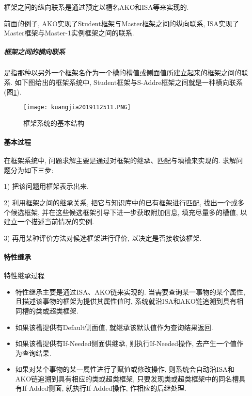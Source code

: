 框架之间的纵向联系是通过预定以槽名AKO和ISA等来实现的.
\begin{example}
  前面的例子, AKO实现了Student框架与Master框架之间的纵向联系, ISA实现了Master框架与Master-1实例框架之间的联系.
\end{example}
\subparagraph{框架之间的横向联系}
是指那种以另外一个框架名作为一个槽的槽值或侧面值所建立起来的框架之间的联系. 如下图给出的框架系统中, Student框架与S-Addre框架之间就是一种横向联系(图\ref{AI32fig11}).
\begin{figure}[H]
\centering
\texttt{[image: kuangjia2019112511.PNG]}
\caption{框架系统的基本结构}
\label{AI32fig11}
\end{figure}
\paragraph{基本过程}
在框架系统中, 问题求解主要是通过对框架的继承、匹配与填槽来实现的. 求解问题分为如下三步:

1) 把该问题用框架表示出来.

2) 利用框架之间的继承关系, 把它与知识库中的已有框架进行匹配, 找出一个或多个候选框架, 并在这些候选框架引导下进一步获取附加信息, 填充尽量多的槽值, 以建立一个描述当前情况的实例.

3) 再用某种评价方法对候选框架进行评价, 以决定是否接收该框架.
\paragraph{特性继承}
特性继承过程
\begin{itemize}
\item  特性继承主要是通过ISA、AKO链来实现的. 当需要查询某一事物的某个属性, 且描述该事物的框架为提供其属性值时, 系统就沿ISA和AKO链追溯到具有相同槽的类或超类框架.
\item  如果该槽提供有Default侧面值, 就继承该默认值作为查询结果返回.
\item  如果该槽提供有If-Needed侧面供继承, 则执行If-Needed操作, 去产生一个值作为查询结果.
\item  如果对某个事物的某一属性进行了赋值或修改操作, 则系统会自动沿ISA和AKO链追溯到具有相应的类或超类框架, 只要发现类或超类框架中的同名槽具有If-Added侧面, 就执行If-Added操作, 作相应的后继处理.
\end{itemize}
